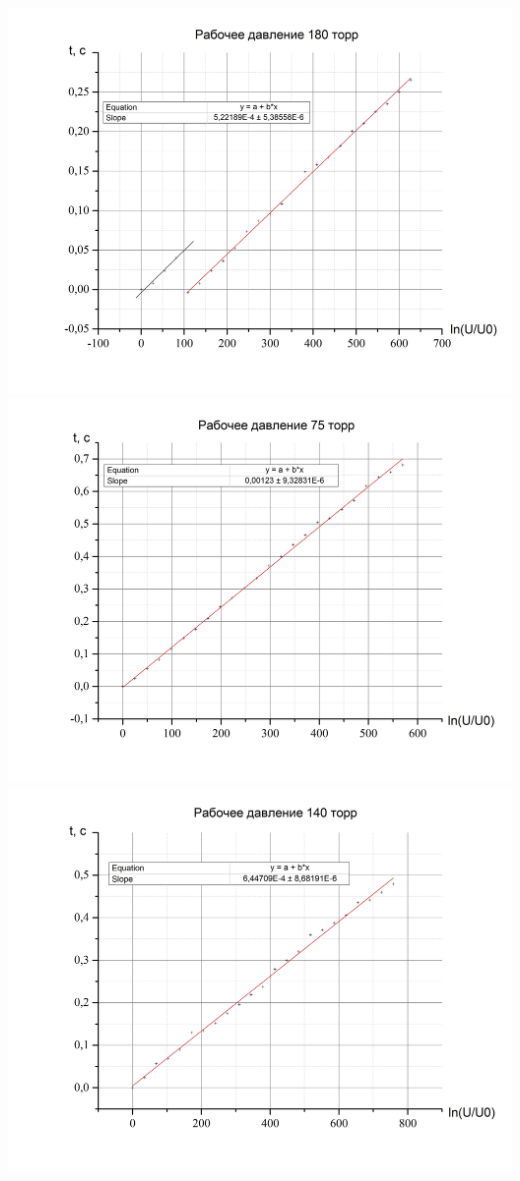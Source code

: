 \documentclass[11pt]{article}
\begin{document}
\includegraphics[scale=0.55]{Graph6.jpg}\\
\includegraphics[scale=0.55]{Graph7.jpg}\\
\includegraphics[scale=0.55]{Graph8.jpg}\\
\end{document}
